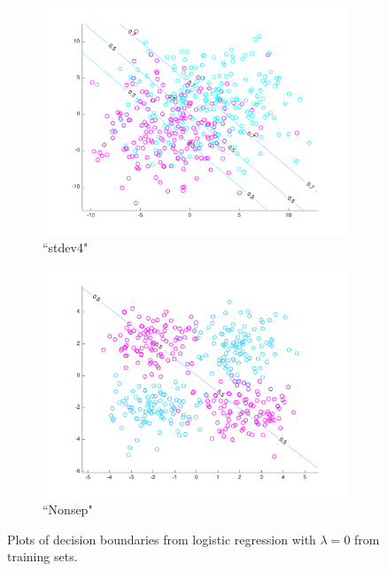 \begin{figure}[h!]
\begin{subfigure}[b]{0.22\textwidth}
	\includegraphics[scale=0.25]{hw2_1_stdev4_a_0.pdf}
	\caption{``stdev4"}\label{fig:data_stdev4a}
    \end{subfigure}  
    \quad
    \begin{subfigure}[b]{0.22\textwidth}
	\includegraphics[scale=0.25]{hw2_1_nonsep_a_0.pdf}
	\caption{``Nonsep"}\label{fig:data_nonsep_a}
    \end{subfigure}  
    \quad
    \caption{Plots of decision boundaries from logistic regression with $\lambda=0$ from training sets.}  \label{fig:LR_plots}  
\end{figure}


